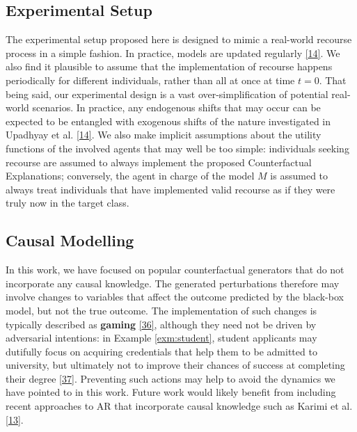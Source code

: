 \documentclass[conference,final,]{IEEEtran}
\theoremstyle{definition}
\theoremstyle{definition}
\theoremstyle{definition}
\theoremstyle{definition}
\theoremstyle{remark}
\begin{document}
\hypertarget{experimental-setup}{%
\subsection{Experimental Setup}\label{experimental-setup}}

The experimental setup proposed here is designed to mimic a real-world recourse process in a simple fashion. In practice, models are updated regularly \protect\hyperlink{ref-upadhyay2021robust}{{[}14{]}}. We also find it plausible to assume that the implementation of recourse happens periodically for different individuals, rather than all at once at time \(t=0\). That being said, our experimental design is a vast over-simplification of potential real-world scenarios. In practice, any endogenous shifts that may occur can be expected to be entangled with exogenous shifts of the nature investigated in Upadhyay et al. \protect\hyperlink{ref-upadhyay2021robust}{{[}14{]}}. We also make implicit assumptions about the utility functions of the involved agents that may well be too simple: individuals seeking recourse are assumed to always implement the proposed Counterfactual Explanations; conversely, the agent in charge of the model \(M\) is assumed to always treat individuals that have implemented valid recourse as if they were truly now in the target class.

\hypertarget{causal-modelling}{%
\subsection{Causal Modelling}\label{causal-modelling}}

In this work, we have focused on popular counterfactual generators that do not incorporate any causal knowledge. The generated perturbations therefore may involve changes to variables that affect the outcome predicted by the black-box model, but not the true outcome. The implementation of such changes is typically described as \textbf{gaming} \protect\hyperlink{ref-miller2020strategic}{{[}36{]}}, although they need not be driven by adversarial intentions: in Example \ref{exm:student}, student applicants may dutifully focus on acquiring credentials that help them to be admitted to university, but ultimately not to improve their chances of success at completing their degree \protect\hyperlink{ref-barocas2022fairness}{{[}37{]}}. Preventing such actions may help to avoid the dynamics we have pointed to in this work. Future work would likely benefit from including recent approaches to AR that incorporate causal knowledge such as Karimi et al. \protect\hyperlink{ref-karimi2021algorithmic}{{[}13{]}}.
\end{document}
